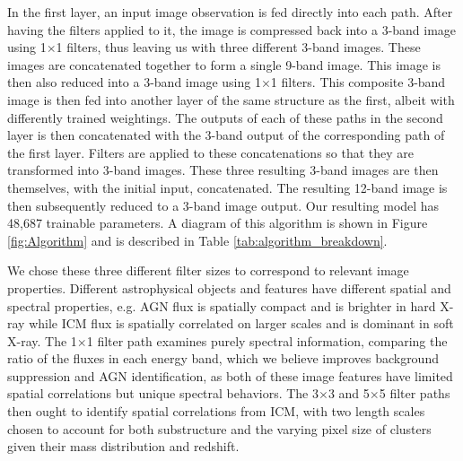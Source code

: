 \documentclass[twocolumn, 11pt]{aastex63}%
\begin{document}
In the first layer, an input image observation is fed directly into each path. After having the filters applied to it, the image is compressed back into a 3-band image using 1$\times$1 filters, thus leaving us with three different 3-band images. These images are concatenated together to form a single 9-band image. This image is then also reduced into a 3-band image using 1$\times$1 filters. This composite 3-band image is then fed into another layer of the same structure as the first, albeit with differently trained weightings. The outputs of each of these paths in the second layer is then concatenated with the 3-band output of the corresponding path of the first layer. Filters are applied to these concatenations so that they are transformed into 3-band images. These three resulting 3-band images are then themselves, with the initial input, concatenated. The resulting 12-band image is then subsequently reduced to a 3-band image output. Our resulting model has 48,687 trainable parameters. A diagram of this algorithm is shown in Figure \ref{fig:Algorithm} and is described in Table \ref{tab:algorithm_breakdown}.

We chose these three different filter sizes to correspond to relevant image properties. Different astrophysical objects and features have different spatial and spectral properties, e.g. AGN flux is spatially compact and is brighter in hard X-ray while ICM flux is spatially correlated on larger scales and is dominant in soft X-ray. The 1$\times$1 filter path examines purely spectral information, comparing the ratio of the fluxes in each energy band, which we believe improves background suppression and AGN identification, as both of these image features have limited spatial correlations but unique spectral behaviors. The 3$\times$3 and 5$\times$5 filter paths then ought to identify spatial correlations from ICM, with two length scales chosen to account for both substructure and the varying pixel size of clusters given their mass distribution and redshift.
\end{document}
